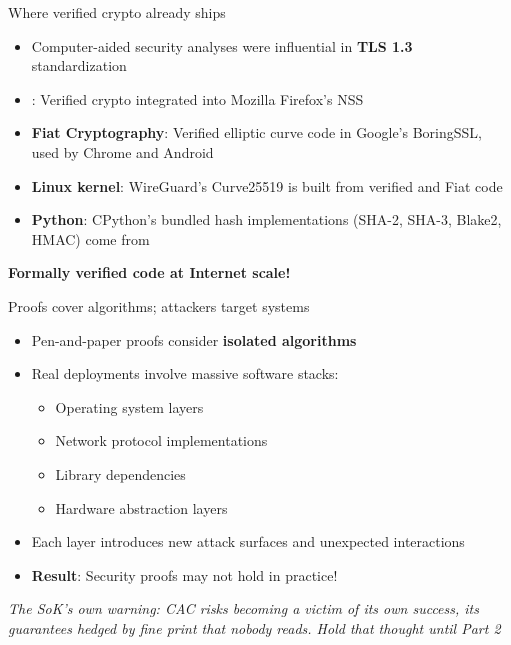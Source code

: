 \ifdefined\PRESENTATION\else\PassOptionsToClass{handout}{beamer}\fi\documentclass[aspectratio=169, lualatex]{beamer}
\begin{document}
\begin{frame}{Where verified crypto already ships}
	\begin{itemize}
		\item Computer-aided security analyses were influential in \textbf{TLS 1.3} standardization
		\item \textbf{\haclstar}: Verified crypto integrated into Mozilla Firefox's NSS
		\item \textbf{Fiat Cryptography}: Verified elliptic curve code in Google's BoringSSL, used by Chrome and Android
		\item \textbf{Linux kernel}: WireGuard's Curve25519 is built from verified \haclstar and Fiat code
		\item \textbf{Python}: CPython's bundled hash implementations (SHA-2, SHA-3, Blake2, HMAC) come from \haclstar
	\end{itemize}
	\vspace{0.5em}
	\begin{center}
		\textbf{Formally verified code at Internet scale!}
	\end{center}
\end{frame}

\begin{frame}{Proofs cover algorithms; attackers target systems}
	\begin{itemize}
		\item Pen-and-paper proofs consider \textbf{isolated algorithms}
		\item Real deployments involve massive software stacks:
		      \begin{itemize}
			      \item Operating system layers
			      \item Network protocol implementations
			      \item Library dependencies
			      \item Hardware abstraction layers
		      \end{itemize}
		\item Each layer introduces new attack surfaces and unexpected interactions
		\item \textbf{Result}: Security proofs may not hold in practice!
	\end{itemize}
	\vspace{0.5em}
	\begin{center}
		\textit{The SoK's own warning: CAC risks becoming a victim of its own success, its guarantees hedged by fine print that nobody reads. Hold that thought until Part 2}
	\end{center}
\end{frame}
\end{document}
